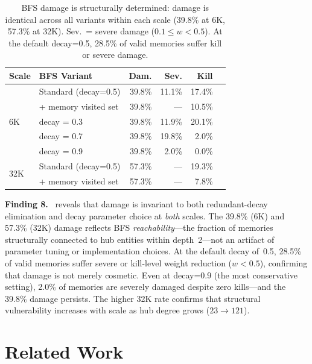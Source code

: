 \documentclass{article}
\newcommand{\finding}[1]{\vspace{2pt}\noindent\textbf{Finding #1.}~}
\begin{document}
\begin{table}[htbp]
\centering
\footnotesize
\begin{tabular}{llrrrr}
\toprule
\textbf{Scale} & \textbf{BFS Variant} & \textbf{Dam.} & \textbf{Sev.} & \textbf{Kill} \\
\midrule
\multirow{5}{*}{6K} & Standard (decay=0.5) & 39.8\% & 11.1\% & 17.4\% \\
& + memory visited set & 39.8\% & --- & 10.5\% \\
\cmidrule{2-5}
& decay = 0.3 & 39.8\% & 11.9\% & 20.1\% \\
& decay = 0.7 & 39.8\% & 19.8\% & 2.0\% \\
& decay = 0.9 & 39.8\% & 2.0\% & 0.0\% \\
\midrule
\multirow{2}{*}{32K} & Standard (decay=0.5) & 57.3\% & --- & 19.3\% \\
& + memory visited set & 57.3\% & --- & 7.8\% \\
\bottomrule
\end{tabular}
\caption{BFS damage is structurally determined: damage is identical across all variants within each scale (39.8\% at 6K, 57.3\% at 32K). Sev.\ = severe damage ($0.1 \leq w < 0.5$). At the default decay=0.5, 28.5\% of valid memories suffer kill or severe damage.}
\label{tab:robust}
\end{table}

\finding{8}  reveals that damage is invariant to both redundant-decay elimination and decay parameter choice at \textit{both} scales.
The 39.8\% (6K) and 57.3\% (32K) damage reflects BFS \textit{reachability}---the fraction of memories structurally connected to hub entities within depth~2---not an artifact of parameter tuning or implementation choices.
At the default decay of~0.5, 28.5\% of valid memories suffer severe or kill-level weight reduction ($w < 0.5$), confirming that damage is not merely cosmetic.
Even at decay=0.9 (the most conservative setting), 2.0\% of memories are severely damaged despite zero kills---and the 39.8\% damage persists.
The higher 32K rate confirms that structural vulnerability increases with scale as hub degree grows ($23 \rightarrow 121$).


\section{Related Work}
\label{sec:related}
\end{document}

